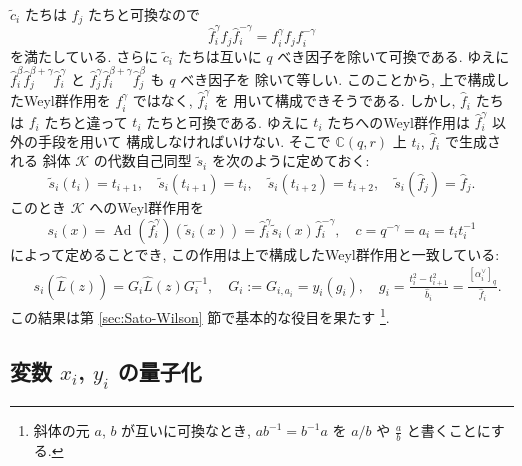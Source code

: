 \documentclass[12pt,twoside,dvipdfm]{msjproc}
\newcommand\C{{\mathbb C}} %
\theoremstyle{definition} %
\theoremstyle{definition} %
\theoremstyle{definition} %
\numberwithin{theorem}{section}
\numberwithin{equation}{section}
\numberwithin{figure}{section}
\numberwithin{table}{section}
\newcommand\secref[1]{第 \ref{#1} 節}
\newcommand\K{\mathcal{K}}
\newcommand\Ad{\mathop{\mathrm{Ad}}\nolimits}
\newcommand\tc{{\tilde{c}}}
\newcommand\ts{{\tilde{s}}}
\newcommand\hL{{\widehat{L}}}
\newcommand\hb{{\hat{b}}}
\newcommand\hf{{\hat{f}}}
\newcommand\av{\alpha^\vee}
\begin{document}
$\tc_i$ たちは $f_j$ たちと可換なので
\begin{equation*}
 \hf_i^\gamma f_j \hf_i^{-\gamma} = f_i^\gamma f_j f_i^{-\gamma}
\end{equation*}
を満たしている.  さらに $\tc_i$ たちは互いに $q$ べき因子を除いて可換である.
ゆえに $\hf_i^\beta \hf_j^{\beta+\gamma} \hf_i^\gamma$ と
$\hf_j^\gamma \hf_i^{\beta+\gamma} \hf_j^\beta$ も $q$ べき因子を
除いて等しい. このことから, 
上で構成したWeyl群作用を $f_i^\gamma$ ではなく, $\hf_i^\gamma$ を
用いて構成できそうである. 
しかし, $\hf_i$ たちは $f_i$ たちと違って $t_i$ たちと可換である.
ゆえに $t_i$ たちへのWeyl群作用は $\hf_i^\gamma$ 以外の手段を用いて
構成しなければいけない. そこで $\C(q,r)$ 上 $t_i$, $\hf_i$ で生成される
斜体 $\K$ の代数自己同型 $\ts_i$ を次のように定めておく:
\begin{equation*}
 \ts_i(t_i)=t_{i+1}, \quad
 \ts_i(t_{i+1})=t_i, \quad
 \ts_i(t_{i+2})=t_{i+2}, \quad
 \ts_i(\hf_j)=\hf_j.
\end{equation*} 
このとき $\K$ へのWeyl群作用を
\begin{equation*}
  s_i(x) = \Ad(\hf_i^\gamma)(\ts_i(x)) = \hf_i^\gamma\ts_i(x)\hf_i^{-\gamma}, \quad
  c = q^{-\gamma} = a_i = t_i t_i^{-1}
\end{equation*}
によって定めることでき, この作用は上で構成したWeyl群作用と一致している:
\begin{align*}
 &
 s_i(\hL(z)) = G_i \hL(z) G_i^{-1}, \quad
 G_i := G_{i,a_i} = y_i(g_i), \quad
 g_i = \frac{t_i^2-t_{i+1}^2}{\hb_i} = \frac{[\av_i]_q}{\hf_i}.
\end{align*}
この結果は\secref{sec:Sato-Wilson}で基本的な役目を果たす%
\footnote{斜体の元 $a$, $b$ が互いに可換なとき, 
$ab^{-1}=b^{-1}a$ を $a/b$ や $\frac{a}{b}$ と書くことにする.}.



\subsection{変数 $x_i$, $y_i$ の量子化}
\label{sec:xy}
\end{document}

